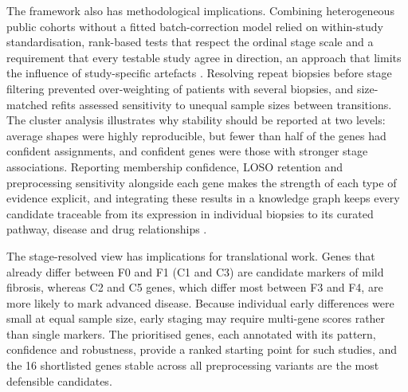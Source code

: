 \documentclass[11pt,a4paper]{article}
\begin{document}
The framework also has methodological implications. Combining heterogeneous public cohorts without a fitted batch-correction model relied on within-study standardisation, rank-based tests that respect the ordinal stage scale and a requirement that every testable study agree in direction, an approach that limits the influence of study-specific artefacts \cite{leek2010,ramasamy2008,sweeney2017}. Resolving repeat biopsies before stage filtering prevented over-weighting of patients with several biopsies, and size-matched refits assessed sensitivity to unequal sample sizes between transitions. The cluster analysis illustrates why stability should be reported at two levels: average shapes were highly reproducible, but fewer than half of the genes had confident assignments, and confident genes were those with stronger stage associations. Reporting membership confidence, LOSO retention and preprocessing sensitivity alongside each gene makes the strength of each type of evidence explicit, and integrating these results in a knowledge graph keeps every candidate traceable from its expression in individual biopsies to its curated pathway, disease and drug relationships \cite{nicholson2020,ochoa2023}.

The stage-resolved view has implications for translational work. Genes that already differ between F0 and F1 (C1 and C3) are candidate markers of mild fibrosis, whereas C2 and C5 genes, which differ most between F3 and F4, are more likely to mark advanced disease. Because individual early differences were small at equal sample size, early staging may require multi-gene scores rather than single markers. The prioritised genes, each annotated with its pattern, confidence and robustness, provide a ranked starting point for such studies, and the 16 shortlisted genes stable across all preprocessing variants are the most defensible candidates.
\end{document}
